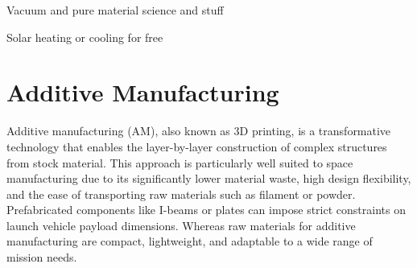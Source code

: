 Vacuum and pure material science and stuff


Solar heating or cooling for free
\newpage
\section{Additive Manufacturing}
Additive manufacturing (AM), also known as 3D printing, is a transformative technology that enables the layer-by-layer construction of complex structures from stock material. This approach is particularly well suited to space manufacturing due to its significantly lower material waste, high design flexibility, and the ease of transporting raw materials such as filament or powder. Prefabricated components like I-beams or plates can impose strict constraints on launch vehicle payload dimensions. Whereas raw materials for additive manufacturing are compact, lightweight, and adaptable to a wide range of mission needs.

